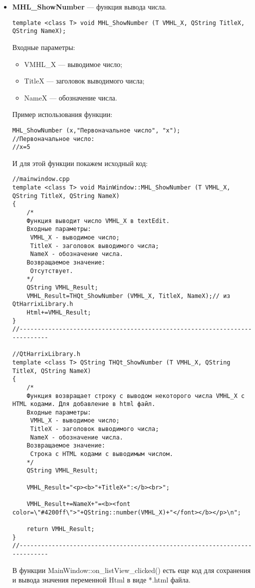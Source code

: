 \documentclass[a4paper,12pt]{article}
\begin{document}
\begin{itemize}
\item \textbf{MHL\_ShowNumber} --- функция вывода числа. 
\begin{lstlisting}[label=examplefunction13, caption=Синтаксис функции MHL\_ShowNumber]
template <class T> void MHL_ShowNumber (T VMHL_X, QString TitleX, QString NameX);
\end{lstlisting}
Входные параметры: 
\begin{itemize}   
    \item  VMHL\_X --- выводимое число;
     \item TitleX --- заголовок выводимого числа;
     \item NameX --- обозначение числа.
\end{itemize}
Пример использования функции:
\begin{lstlisting}[label=examplefunction10, caption=Пример использования MHL\_ShowNumber]
MHL_ShowNumber (x,"Первоначальное число", "x");
//Первоначальное число:
//x=5
\end{lstlisting}
И для этой функции покажем исходный код:
\begin{lstlisting}[label=examplefunction11, caption=Реализация функции MHL\_ShowNumber]
//mainwindow.cpp
template <class T> void MainWindow::MHL_ShowNumber (T VMHL_X, QString TitleX, QString NameX)
{
    /*
    Функция выводит число VMHL_X в textEdit.
    Входные параметры:
     VMHL_X - выводимое число;
     TitleX - заголовок выводимого числа;
     NameX - обозначение числа.
    Возвращаемое значение:
     Отсутствует.
    */
    QString VMHL_Result;
    VMHL_Result=THQt_ShowNumber (VMHL_X, TitleX, NameX);// из QtHarrixLibrary.h
    Html+=VMHL_Result;
}
//---------------------------------------------------------------------------

//QtHarrixLibrary.h
template <class T> QString THQt_ShowNumber (T VMHL_X, QString TitleX, QString NameX)
{
    /*
    Функция возвращает строку с выводом некоторого числа VMHL_X с HTML кодами. Для добавление в html файл.
    Входные параметры:
     VMHL_X - выводимое число;
     TitleX - заголовок выводимого числа;
     NameX - обозначение числа.
    Возвращаемое значение:
     Строка с HTML кодами с выводимым числом.
    */
    QString VMHL_Result;

    VMHL_Result="<p><b>"+TitleX+":</b><br>";

    VMHL_Result+=NameX+"=<b><font color=\"#4200ff\">"+QString::number(VMHL_X)+"</font></b></p>\n";

    return VMHL_Result;
}
//---------------------------------------------------------------------------
\end{lstlisting}
В функции MainWindow::on\_listView\_clicked() есть еще код для сохранения и вывода значения переменной Html в виде *.html файла.


\end{itemize}
\end{document}
